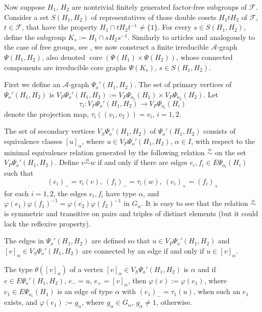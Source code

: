 \documentclass[10pt, reqno]{amsart}
\numberwithin{equation}{section}
\begin{document}
Now suppose  $H_1$, $H_2$  are  nontrivial finitely generated factor-free subgroups of ${\mathcal{F}}$.
Consider a set $S(H_1, H_2)$ of representatives of those double cosets
$H_1 t H_2$ of ${\mathcal{F}}$, $t \in {\mathcal{F}}$,   that have the property $H_1 \cap t H_2 t^{-1} \ne  \{ 1 \}$.
For every $s \in S(H_1, H_2)$,  define the subgroup $K_s := H_1 \cap s H_2 s^{-1}$.
Similarly to articles \cite{Iv99, Iv01,  Iv08, Iv10, Iv12} and analogously to  the case of free groups, see  \cite{D, N2}, we now construct a finite irreducible  ${\mathcal{A}}$-graph $\Psi(H_1, H_2)$, also denoted $\operatorname{core}(\Psi(H_1) \times \Psi(H_2))$,  whose connected components are irreducible  core graphs $\Psi(K_s)$, $s \in S(H_1, H_2)$.

First we define an ${\mathcal{A}}$-graph $\Psi_o'(H_1, H_2)$. The set  of primary vertices of
$\Psi_o'(H_1, H_2)$ is
$V_P \Psi_o'(H_1, H_2)   := V_P \Psi_{o_1}(H_1)\times V_P \Psi_{o_2}(H_2)$. Let
$$
\tau_i : V_P \Psi_o'(H_1, H_2) \to V_P \Psi_{o_i}(H_i)
$$
denote the projection map, $\tau_i((v_1, v_2)) = v_i$, $i=1,2$.

The set of secondary vertices $V_S \Psi_o'(H_1, H_2)$ of
$\Psi_o'(H_1, H_2)$ consists of equivalence classes $[u]_{\alpha}$, where  $u \in V_P \Psi_o'(H_1, H_2)$, ${\alpha} \in I$, with respect to  the minimal  equivalence relation generated by   the following relation   $\overset {\alpha} \sim$ on the set  $V_P \Psi_o'(H_1, H_2)$.  Define $v \overset {\alpha} \sim w$ if and only if there are edges $e_i, f_i \in E \Psi_{o_i}(H_i)$ such that $$
(e_i)_- = \tau_i(v) , \  (f_i)_- = \tau_i(w) ,  \ (e_i)_+ = (f_i)_+
$$
for each  $i=1,2$, the edges  $e_i, f_i$ have type ${\alpha}$, and ${\varphi}(e_1) {\varphi}(f_1)^{-1} = {\varphi}(e_2) {\varphi}(f_2)^{-1}$ in $G_{\alpha}$. It is easy to see that the relation  $\overset {\alpha} \sim$  is symmetric and transitive on pairs and triples of distinct elements (but it could lack the reflexive property).

The edges in $\Psi_o'(H_1, H_2)$  are defined so that $u \in  V_P \Psi_o'(H_1, H_2)$ and
$[v]_{\alpha} \in V_S \Psi_o'(H_1, H_2)$ are connected by an edge if and only if $u  \in [v]_{\alpha}$.

The type ${\theta}([v]_{\alpha})$  of a vertex $[v]_{\alpha} \in V_S \Psi_o'(H_1, H_2)$  is ${\alpha}$ and if  $e \in E\Psi_o'(H_1, H_2)$,  $e_- =u$, $e_+ = [v]_{\alpha}$, then ${\varphi}(e) :={\varphi}(e_1)$, where $e_1  \in E\Psi_{o_1}(H_1)$
is an edge of type ${\alpha}$ with $(e_1)_- = \tau_1(u)$, when such an $e_1$ exists, and ${\varphi}(e_1) :=g_{\alpha} $, where $g_{\alpha} \in G_{\alpha}$, $g_{\alpha} \ne 1$,    otherwise.
\end{document}
